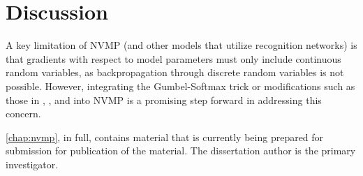\section{Discussion}

A key limitation of NVMP 
(and other models that utilize recognition networks)
is that gradients with respect to model parameters
must only include continuous random variables,
as backpropagation through discrete random
variables is not possible. However, integrating 
the Gumbel-Softmax trick or modifications
such as those in 
\citet{Rolfe2016}, \citet{Vahdat2018dvaeplus}, \citet{Vahdat2018dvaesharp} and \citet{Van2016} into NVMP is a promising
step forward in addressing this concern.

\autoref{chap:nvmp}, in full, contains
material that is currently being prepared for
submission for publication of the material.
The dissertation author is the primary investigator.
